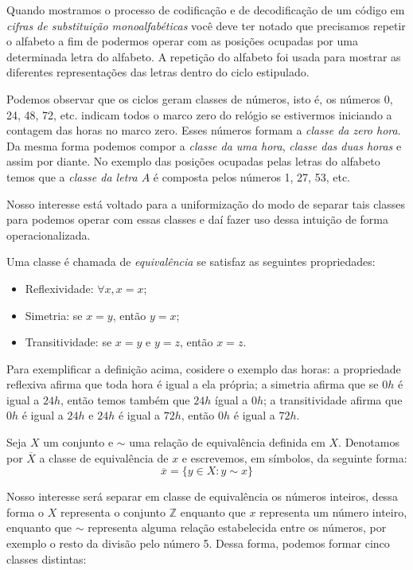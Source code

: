 Quando mostramos o processo de codifica\c{c}\~ao e de decodifica\c{c}\~ao de um c\'odigo em 
\textit{cifras de substitui\c{c}\~ao monoalfab\'eticas} voc\^e deve ter notado que precisamos repetir o alfabeto a fim de podermos operar com as posi\c{c}\~oes ocupadas por uma determinada letra do alfabeto. A repeti\c{c}\~ao do alfabeto foi usada para mostrar as diferentes representa\c{c}\~oes das letras dentro do ciclo estipulado.

Podemos observar que os ciclos geram classes de n\'umeros, isto \'e, os n\'umeros 0, 24, 48, 72, etc. indicam todos o marco zero do rel\'ogio se estivermos iniciando a contagem das horas no marco zero. Esses n\'umeros formam a \textsl{classe da zero hora}. Da mesma forma podemos compor a \textsl{classe da uma hora}, \textsl{classe das duas horas} e assim por diante. No exemplo das posi\c{c}\~oes ocupadas pelas letras do alfabeto temos que a \textsl{classe da letra $A$} \'e composta pelos n\'umeros 1, 27, 53, etc. 

Nosso interesse est\'a voltado para a uniformiza\c{c}\~ao do modo de separar tais classes para podemos operar com essas classes e da\'i fazer uso dessa intui\c{c}\~ao de forma operacionalizada. 

\begin{Df}
	Uma classe \'e chamada de \textsl{equival\^encia} se satisfaz as seguintes propriedades:
	\begin{itemize}
		\item Reflexividade: $\forall x, x=x$; 		
		\item Simetria: se $x=y$, ent\~ao $y=x$; 
		\item Transitividade: se $x=y$ e $y=z$, ent\~ao $x=z$.
	\end{itemize}
\end{Df}   

Para exemplificar a defini\c{c}\~ao acima, cosidere o exemplo das horas: a propriedade reflexiva afirma que toda hora \'e igual a ela pr\'opria; a simetria afirma que se $0h$ \'e igual a $24h$, ent\~ao temos tamb\'em que $24h$ \' igual a $0h$; a transitividade afirma que $0h$ \'e igual a $24h$ e $24h$ \'e igual a $72h$, ent\~ao $0h$ \'e igual a $72h$.

Seja $X$ um conjunto e $\sim$ uma rela\c{c}\~ao de equival\^encia definida em $X$. Denotamos por $\overline{X}$ a classe de equival\^encia de $x$ e escrevemos, em s\'imbolos, da seguinte forma:	
	                     $$\overline{x}=\{y\in X: y\sim x\}$$

Nosso interesse ser\'a separar em classe de equival\^encia os n\'umeros inteiros, dessa forma o $X$ representa o conjunto $\mathbb{Z}$ enquanto que $x$ representa um n\'umero inteiro, enquanto que $\sim$ representa alguma rela\c{c}\~ao estabelecida entre os n\'umeros, por exemplo o resto da divis\~ao pelo n\'umero 5. Dessa forma, podemos formar cinco classes distintas:

